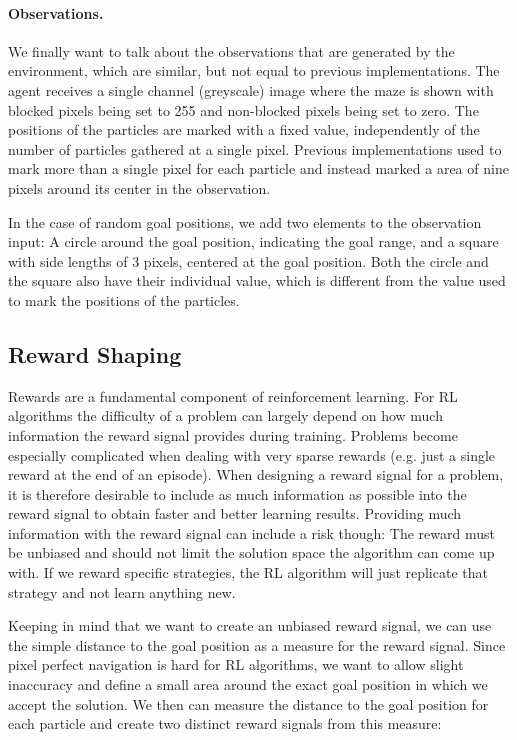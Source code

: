 \paragraph{Observations. }
We finally want to talk about the observations that are generated by the environment, which are similar, but not equal to previous implementations. The agent receives a single channel (greyscale) image where the maze is shown with blocked pixels being set to 255 and non-blocked pixels being set to zero. The positions of the particles are marked with a fixed value, independently of the number of particles gathered at a single pixel. Previous implementations used to mark more than a single pixel for each particle and instead marked a area of nine pixels around its center in the observation. 

In the case of random goal positions, we add two elements to the observation input: A circle around the goal position, indicating the goal range, and a square with side lengths of 3 pixels, centered at the goal position. Both the circle and the square also have their individual value, which is different from the value used to mark the positions of the particles. 

\subsection{Reward Shaping} \label{sec:MazeReward}
Rewards are a fundamental component of reinforcement learning. For RL algorithms the difficulty of a problem can largely depend on how much information the reward signal provides during training. Problems become especially complicated when dealing with very sparse rewards (e.g. just a single reward at the end of an episode). When designing a reward signal for a problem, it is therefore desirable to include as much information as possible into the reward signal to obtain faster and better learning results. Providing much information with the reward signal can include a risk though: The reward must be unbiased and should not limit the solution space the algorithm can come up with. If we reward specific strategies, the RL algorithm will just replicate that strategy and not learn anything new.

Keeping in mind that we want to create an unbiased reward signal, we can use the simple distance to the goal position as a measure for the reward signal. Since pixel perfect navigation is hard for RL algorithms, we want to allow slight inaccuracy and define a small area around the exact goal position in which we accept the solution. We then can measure the distance to the goal position for each particle and create two distinct reward signals from this measure:

